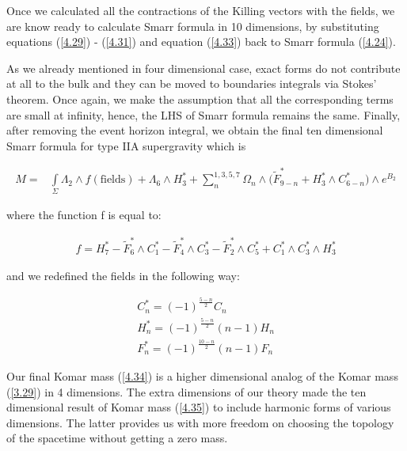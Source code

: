 \documentclass[a4paper,notitlepage]{report}
\begin{document}
Once we calculated all the contractions of the Killing vectors with the fields, we are know ready to calculate Smarr formula in 10 dimensions, by substituting equations (\ref{4.29}) - (\ref{4.31}) and equation (\ref{4.33}) back to Smarr formula (\ref{4.24}). 

As we already mentioned in four dimensional case, exact forms do not contribute at all to the bulk and they can be moved to boundaries integrals via Stokes' theorem. Once again, we make the assumption that all the corresponding terms are small at infinity, hence, the LHS of Smarr formula remains the same. Finally,  after removing the event horizon integral, we obtain the final ten dimensional Smarr formula for type IIA supergravity which is

\begin{align} \label{4.34}
M = &\int\limits_{\Sigma} \Lambda_2 \wedge f(\text{fields}) + \Lambda_6 \wedge H^{*}_3 + \sum_{n}^{1,3,5,7} \Omega_n \wedge \Big( \tilde{F}^{*}_{9-n} + H^{*}_3 \wedge C^{*}_{6-n}  \Big) \wedge e^{B_2}
\end{align}

\vspace{0.5em} 
where the function f is equal to:

\begin{align} \label{4.35}
f = H^{*}_7 - \tilde{F}^{*}_{6} \wedge C^{*}_{1} - \tilde{F}^{*}_{4} \wedge C^{*}_{3} -  \tilde{F}^{*}_{2} \wedge C^{*}_{5} + C^{*}_{1} \wedge C^{*}_{3} \wedge H^{*}_3
\end{align}

\vspace{0.5em} 
and we redefined the fields in the following way:

\begin{gather}
C^{*}_{n} = (-1)^{\frac{5-n}{2}} C_n \label{4.36} \\
H^{*}_n = (-1)^{\frac{5-n}{2}} (n-1) H_n \label{4.37} \\
F^{*}_{n} = (-1)^{\frac{10-n}{2}} (n-1) F_n \label{4.38}
\end{gather}

\vspace{0.5em} 
Our final Komar mass (\ref{4.34}) is a higher dimensional analog of the Komar mass (\ref{3.29}) in 4 dimensions. The extra dimensions of our theory made the ten dimensional result of Komar mass (\ref{4.35}) to include harmonic forms of various dimensions. The latter provides us with more freedom on choosing the topology of the spacetime without getting a zero mass.
\end{document}
